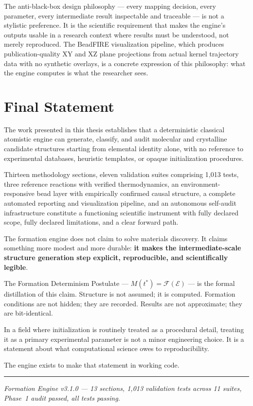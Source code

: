 \documentclass[11pt]{article}
\begin{document}
The anti-black-box design philosophy --- every mapping decision,
every parameter, every intermediate result inspectable and traceable
--- is not a stylistic preference.  It is the scientific requirement
that makes the engine's outputs usable in a research context where
results must be understood, not merely reproduced.  The BeadFIRE
visualization pipeline, which produces publication-quality XY and XZ
plane projections from actual kernel trajectory data with no
synthetic overlays, is a concrete expression of this philosophy:
what the engine computes is what the researcher sees.

\section{Final Statement}

The work presented in this thesis establishes that a deterministic
classical atomistic engine can generate, classify, and audit molecular
and crystalline candidate structures starting from elemental identity
alone, with no reference to experimental databases, heuristic templates,
or opaque initialization procedures.

Thirteen methodology sections, eleven validation suites comprising
1,013 tests, three reference reactions with verified thermodynamics,
an environment-responsive bead layer with empirically confirmed
causal structure, a complete automated reporting and visualization
pipeline, and an autonomous self-audit infrastructure constitute a
functioning scientific instrument with fully declared scope, fully
declared limitations, and a clear forward path.

The formation engine does not claim to solve materials discovery.
It claims something more modest and more durable: \textbf{it makes
the intermediate-scale structure generation step explicit, reproducible,
and scientifically legible}.

The Formation Determinism Postulate ---
$M(t^{*}) = \mathcal{F}(\mathcal{E})$ ---
is the formal distillation of this claim.  Structure is not assumed;
it is computed.  Formation conditions are not hidden; they are
recorded.  Results are not approximate; they are bit-identical.

In a field where initialization is routinely treated as a procedural
detail, treating it as a primary experimental parameter is not a
minor engineering choice.  It is a statement about what computational
science owes to reproducibility.

The engine exists to make that statement in working code.

\vspace{2em}
\noindent\rule{0.4\textwidth}{0.4pt}

\noindent\textit{Formation Engine v3.1.0 ---
13 sections, 1,013 validation tests across 11 suites,
Phase~1 audit passed, all tests passing.}
\end{document}
